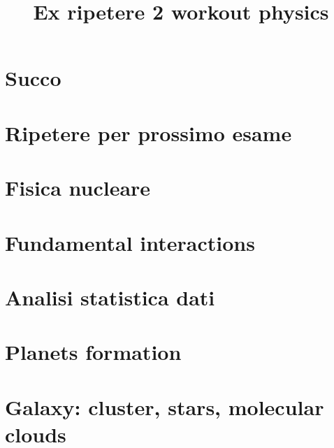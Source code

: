 \documentclass[oneside,20pt,fleqn,extrafontsizes]{memoir}
\title{Ex ripetere 2 workout physics}
\begin{document}
\pagestyle{mystyle}%
\renewcommand*{\contentsname}{\label{toc}{Table of Contents}}%
\maketitle
\listoftodos
\tableofcontents*
\part{Succo}

\part{Ripetere per prossimo esame}

\part{Fisica nucleare}

%
\part{Fundamental interactions}\label{intfon}



\part{Analisi statistica dati}\label{asd}



\part{Planets formation}\label{ppd}

\part{Galaxy: cluster, stars, molecular clouds}\label{stars}


\end{document}
